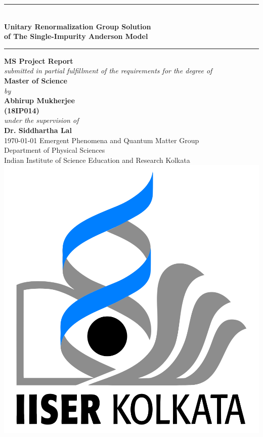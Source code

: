 \begin{titlepage}
	\centering
	\rule{\textwidth}{3pt}\\
	\vspace*{20pt}
	{
		\textbf{\LARGE Unitary Renormalization Group Solution}\\[10pt]
		\textbf{\LARGE of The Single-Impurity Anderson Model}\\[10pt]
	}
	\rule{\textwidth}{3pt} %
	\vfill
	{\Large \textbf{MS Project Report}}\\
	\vfill
	\textit{\large{ submitted in partial fulfillment of the requirements for the degree of }}\\
	\vfill
	{\Large \textbf{Master of Science\\}}
	\vfill
	\textit{\large by \\}
	\vfill
	{\Large \textbf{Abhirup Mukherjee \\}
	\vspace*{5pt}
	\textbf{(18IP014)\\}
	\vfill
	\textit{\large under the supervision of \\}
	\vfill
	{\Large \textbf{Dr. Siddhartha Lal}\\
	\vfill
	\today
	\vfill
	Emergent Phenomena and Quantum Matter Group\\
	\vspace{0.01\textheight}
	Department of Physical Sciences\\
	\vspace{0.01\textheight}
	Indian Institute of Science Education and Research Kolkata\\}}
	\vfill
	\includegraphics[scale=0.15]{../figures/logo.png}\\
\end{titlepage}
